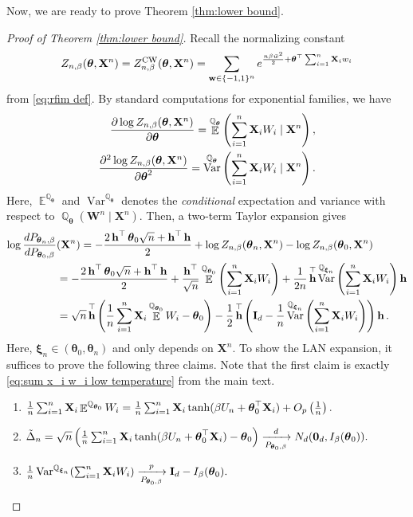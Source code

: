 \documentclass[preprint,reqno]{imsart}
\newcommand{\ttheta}{\boldsymbol{\theta}}
\newcommand{\I}{\mathbf{I}_{\mathnormal{d}}}
\DeclareMathOperator{\bw}{\textbf{w}}
\DeclareMathOperator{\bh}{\textbf{h}}
\DeclareMathOperator{\EE}{\mathbb{E}}
\DeclareMathOperator{\Var}{Var}
\DeclareMathOperator{\QQ}{\mathbb{Q}}
\newcommand{\W}{\mathbf{W}}
\newcommand{\X}{\mathbf{X}}
\newcommand{\xxi}{\boldsymbol \xi}
\DeclareMathOperator{\sumin}{\sum_{\mathnormal i=1}^{\mathnormal n}}
\begin{document}
\begin{appendix}
Now, we are ready to prove Theorem \ref{thm:lower bound}.

\begin{proof}[Proof of Theorem \ref{thm:lower bound}]
Recall the normalizing constant 
$$Z_{n, \beta}(\ttheta, \X^n) = Z_{n, \beta}^{\text{CW}}(\ttheta, \X^n) = \sum_{\bw \in \{-1,1\}^n} e^{\frac{n\beta \bar{w}^2}{2}  + \ttheta^\top \sumin \X_i w_i} $$
from \eqref{eq:rfim def}. By standard computations for exponential families, we have
\begin{align*}
    \frac{\partial \log Z_{n, \beta}(\ttheta, \X^n)}{\partial \ttheta} = \EE^{\QQ_{\ttheta}} \left(\sumin \X_i W_i \mid \X^n \right), \\
    \frac{\partial^2 \log Z_{n, \beta}(\ttheta, \X^n)}{\partial \ttheta^2}  = \Var^{\QQ_{\ttheta}} \left(\sumin \X_i W_i \mid \X^n \right).
\end{align*}
Here, $\EE^{\QQ_{\ttheta}}$ and $\Var^{\QQ_{\ttheta}}$ denotes the \emph{conditional} expectation and variance with respect to ${\QQ}_{\ttheta}(\W^n \mid \X^n)$. %
Then, a two-term Taylor expansion gives
\begin{align*}
    \log \frac{dP_{\ttheta_n, \beta}}{dP_{\ttheta_0, \beta}} &(\X^n) =  -\frac{2\bh^\top \ttheta_0 \sqrt{n} + \bh^\top \bh}{2} + \log Z_{n, \beta}(\ttheta_n, \X^n) - \log Z_{n, \beta}(\ttheta_0, \X^n) \\
    &= -\frac{2 \bh^\top \ttheta_0 \sqrt{n} + 
    \bh^\top \bh}{2} + \frac{\bh^\top}{\sqrt{n}} \EE^{\QQ_{\ttheta_0}} \left(\sumin \X_i W_i \right) + \frac{1}{2n} \bh^\top \Var^{\QQ_{\xxi_n}} \left(\sumin \X_i W_i \right) \bh \\
    &= \sqrt{n}\bh^\top \left(\frac{1}{n} \sumin \X_i \EE^{\QQ_{\ttheta_0}} W_i  - \ttheta_0 \right) - \frac{1}{2} \bh^\top \left(\I - \frac{1}{n}\Var^{\QQ_{\xxi_n}} \left(\sumin \X_i W_i \right) \right) \bh.
\end{align*}
Here, $\xxi_n \in (\ttheta_0, \ttheta_n)$ and only depends on $\X^n$. To show the LAN expansion, it suffices to prove the following three claims. Note that the first claim is exactly \eqref{eq:sum x_i w_i low temperature} from the main text.
\begin{enumerate}
    \item[Claim 1.] $\frac{1}{n} \sumin \X_i \EE^{\QQ_{\ttheta_0}} W_i = \frac{1}{n} \sumin \X_i \tanh (\beta U_n + \ttheta_0^\top \X_i) + O_p\left( \frac{1}{n} \right).$
    \item[Claim 2.] $\tilde{\Delta}_n = \sqrt{n} \left(\frac{1}{n} \sumin \X_i \tanh(\beta U_n + \ttheta_0^\top \X_i) - \ttheta_0 \right) \xrightarrow[P_{\ttheta_0, \beta}]{d} N_d(\mathbf{0}_d, I_\beta(\ttheta_0)).$
    \item[Claim 3.] $\frac{1}{n}\Var^{\QQ_{\xxi_n}} (\sumin \X_i W_i) \xrightarrow[P_{\ttheta_0, \beta}]{p} \I - I_\beta(\ttheta_0).$
\end{enumerate}
%
%
%


\end{proof}
\end{appendix}
\end{document}
